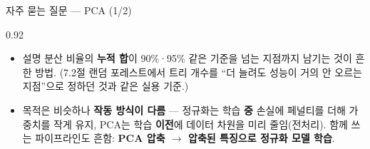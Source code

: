 \begin{frame}{자주 묻는 질문 --- PCA (1/2)}
\begin{center}\begin{varwidth}{0.92\textwidth}
  \small
  \begin{itemize}
    \item {}
      설명 분산 비율의 \textbf{누적 합}이 90\%·95\% 같은 기준을 넘는
      지점까지 남기는 것이 흔한 방법. \; (7.2절 랜덤 포레스트에서 트리
      개수를 ``더 늘려도 성능이 거의 안 오르는 지점''으로 정하던 것과
      같은 실용 기준.)
    \item {}
      목적은 비슷하나 \textbf{작동 방식이 다름} --- 정규화는 학습 \textbf{중}
      손실에 페널티를 더해 가중치를 작게 유지, PCA는 학습 \textbf{이전}에
      데이터 차원을 미리 줄임(전처리). \; 함께 쓰는 파이프라인도 흔함:
      \textbf{PCA 압축 $\to$ 압축된 특징으로 정규화 모델 학습}.
  \end{itemize}
\end{varwidth}\end{center}
\end{frame}
